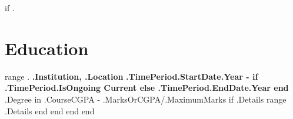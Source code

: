 
{{if .}}
    \section{Education}
    \resumeSubHeadingListStart

    {{range .}}
        \resumeSubheading
        {\textbf{ {{.Institution}}, {{.Location}} }}{\textbf{ {{.TimePeriod.StartDate.Year}} - {{if .TimePeriod.IsOngoing}} Current {{else}} {{.TimePeriod.EndDate.Year}} {{end}}} }{ {{.Degree}} in {{.Course}}}{CGPA - {{.MarksOrCGPA}}/{{.MaximumMarks}} }
        {{if .Details}}
            \vspace{-10pt}
            \resumeItemListStart
            {{range .Details}} 
            {{end}}
            \resumeItemListEnd
        {{end}}
    {{end}}
    \resumeSubHeadingListEnd
{{end}}
